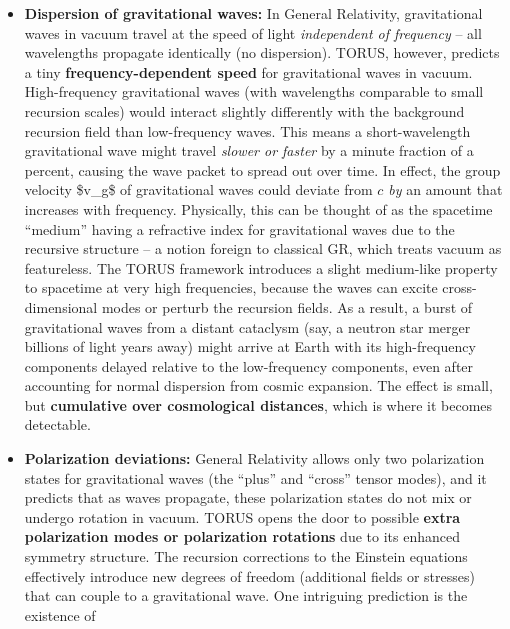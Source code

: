 \documentclass[
]{article}
\begin{document}
{\begin{itemize}
\item
  \textbf{Dispersion of gravitational waves:} In General Relativity,
  gravitational waves in vacuum travel at the speed of light
  \emph{independent of frequency} -- all wavelengths propagate
  identically (no dispersion). TORUS, however, predicts a tiny
  \textbf{frequency-dependent speed} for gravitational waves in
  vacuum\hspace{0pt}. High-frequency gravitational waves (with
  wavelengths comparable to small recursion scales) would interact
  slightly differently with the background recursion field than
  low-frequency waves. This means a short-wavelength gravitational wave
  might travel \emph{slower or faster} by a minute fraction of a
  percent, causing the wave packet to spread out over time. In effect,
  the group velocity \$v\_g\$ of gravitational waves could deviate from
  \emph{$c$ by} an amount that increases with frequency\hspace{0pt}.
  Physically, this can be thought of as the spacetime ``medium'' having
  a refractive index for gravitational waves due to the recursive
  structure -- a notion foreign to classical GR, which treats vacuum as
  featureless. The TORUS framework introduces a slight medium-like
  property to spacetime at very high frequencies, because the waves can
  excite cross-dimensional modes or perturb the recursion fields. As a
  result, a burst of gravitational waves from a distant cataclysm (say,
  a neutron star merger billions of light years away) might arrive at
  Earth with its high-frequency components delayed relative to the
  low-frequency components, even after accounting for normal dispersion
  from cosmic expansion. The effect is small, but \textbf{cumulative
  over cosmological distances}, which is where it becomes
  detectable\hspace{0pt}.
\item
  \textbf{Polarization deviations:} General Relativity allows only two
  polarization states for gravitational waves (the ``plus'' and
  ``cross'' tensor modes), and it predicts that as waves propagate,
  these polarization states do not mix or undergo rotation in vacuum.
  TORUS opens the door to possible \textbf{extra polarization modes or
  polarization rotations} due to its enhanced symmetry structure. The
  recursion corrections to the Einstein equations effectively introduce
  new degrees of freedom (additional fields or stresses) that can couple
  to a gravitational wave. One intriguing prediction is the existence of

\end{itemize}}
\end{document}
